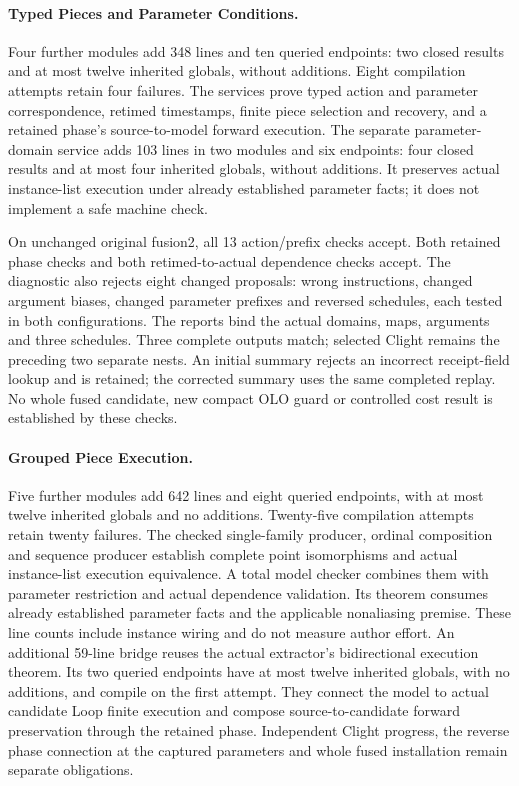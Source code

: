 \paragraph{Typed Pieces and Parameter Conditions.}
Four further modules add 348 lines and ten queried endpoints: two closed
results and at most twelve inherited globals, without additions. Eight
compilation attempts retain four failures. The services prove typed action and
parameter correspondence, retimed timestamps, finite piece selection and
recovery, and a retained phase's source-to-model forward execution. The separate
parameter-domain service adds 103 lines in two modules and six endpoints:
four closed results and at most four inherited globals, without additions.
It preserves actual instance-list execution under already established
parameter facts; it does not implement a safe machine check.

On unchanged original fusion2, all 13 action/prefix checks accept. Both
retained phase checks and both retimed-to-actual dependence checks accept.
The diagnostic also rejects eight changed proposals: wrong instructions,
changed argument biases, changed parameter prefixes and reversed schedules,
each tested in both configurations. The reports bind the actual domains,
maps, arguments and three schedules. Three complete outputs match; selected
Clight remains the preceding two separate nests. An initial summary rejects
an incorrect receipt-field lookup and is retained; the corrected summary uses
the same completed replay. No whole fused candidate, new compact OLO guard or
controlled cost result is established by these checks.

\paragraph{Grouped Piece Execution.}
Five further modules add 642 lines and eight queried endpoints, with at most
twelve inherited globals and no additions. Twenty-five compilation attempts
retain twenty failures. The checked single-family producer, ordinal composition
and sequence producer establish complete point isomorphisms and actual
instance-list execution equivalence. A total model checker combines them with
parameter restriction and actual dependence validation. Its theorem consumes
already established parameter facts and the applicable nonaliasing premise.
These line counts include instance wiring and do not measure author effort.
An additional 59-line bridge reuses the actual extractor's bidirectional
execution theorem. Its two queried endpoints have at most twelve inherited
globals, with no additions, and compile on the first attempt. They connect the
model to actual candidate Loop finite execution and compose source-to-candidate
forward preservation through the retained phase. Independent Clight progress,
the reverse phase connection at the captured parameters and whole fused
installation remain separate obligations.

